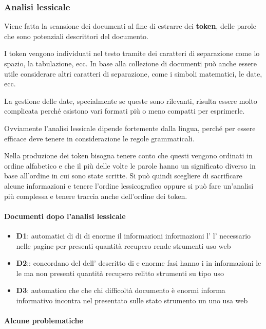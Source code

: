 \subsubsection{Analisi lessicale}

Viene fatta la scansione dei documenti al fine di estrarre dei \textbf{token}, delle parole che sono potenziali descrittori del documento.

I token vengono individuati nel testo tramite dei caratteri di separazione come lo spazio, la tabulazione, ecc. In base alla collezione di documenti può anche essere utile considerare altri caratteri di separazione, come i simboli matematici, le date, ecc.

La gestione delle date, specialmente se queste sono rilevanti, risulta essere molto complicata perché esistono vari formati più o meno compatti per esprimerle.

Ovviamente l'analisi lessicale dipende fortemente dalla lingua, perché per essere efficace deve tenere in considerazione le regole grammaticali.

Nella produzione dei token bisogna tenere conto che questi vengono ordinati in ordine alfabetico e che il più delle volte le parole hanno un significato diverso in base all'ordine in cui sono state scritte. 
Si può quindi scegliere di sacrificare alcune informazioni e tenere l'ordine lessicografico oppure si può fare un'analisi più complessa e tenere traccia anche dell'ordine dei token.

\paragraph{Documenti dopo l'analisi lessicale}

\begin{itemize}
	\item \textbf{D1}: automatici di di di enorme il informazioni
	informazioni l' l' necessario nelle pagine per presenti quantità recupero rende strumenti uso web
	\item \textbf{D2}:: concordano del dell' descritto di e enorme fasi hanno i in informazioni le le ma non presenti quantità recupero relitto strumenti su tipo uso 
	\item \textbf{D3}: automatico che che chi difficoltà documento è enormi informa informativo incontra nel presentato sulle stato strumento un uno usa web 
\end{itemize}

\paragraph{Alcune problematiche}

